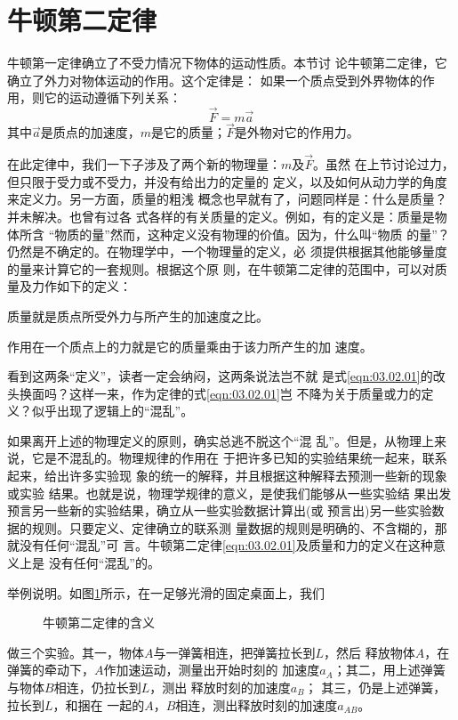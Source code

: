 \documentclass[../outline-of-mechanics.tex]{subfiles}
\begin{document}
\section{牛顿第二定律}\label{sec:03.02}

牛顿第一定律确立了不受力情况下物体的运动性质。本节讨
论牛顿第二定律，它确立了外力对物体运动的作用。这个定律是：
如果一个质点受到外界物体的作用，则它的运动遵循下列关系：
\begin{equation}\label{eqn:03.02.01}
  \vec{F} = m \vec{a}
\end{equation}
其中$\vec{a}$是质点的加速度，$m$是它的质量；$\vec{F}$是外物对它的作用力。

在此定律中，我们一下子涉及了两个新的物理量：$m$及$\vec{F}$。虽然
在上节讨论过力，但只限于受力或不受力，并没有给出力的定量的
定义，以及如何从动力学的角度来定义力。另一方面，质量的粗浅
概念也早就有了，问题同样是：什么是质量？并未解决。也曾有过各
式各样的有关质量的定义。例如，有的定义是：质量是物体所含
“物质的量”然而，这种定义没有物理的价值。因为，什么叫“物质
的量”？仍然是不确定的。在物理学中，一个物理量的定义，必
须提供根据其他能够量度的量来计算它的一套规则。根据这个原
则，在牛顿第二定律的范围中，可以对质量及力作如下的定义：

质量就是质点所受外力与所产生的加速度之比。

作用在一个质点上的力就是它的质量乘由于该力所产生的加
速度。

看到这两条“定义”，读者一定会纳闷，这两条说法岂不就
是式\eqref{eqn:03.02.01}的改头换面吗？这样一来，作为定律的式\eqref{eqn:03.02.01}岂
不降为关于质量或力的定义？似乎出现了逻辑上的“混乱”。

如果离开上述的物理定义的原则，确实总逃不脱这个“混
乱”。但是，从物理上来说，它是不混乱的。物理规律的作用在
于把许多已知的实验结果统一起来，联系起来，给出许多实验现
象的统一的解释，并且根据这种解释去预测一些新的现象或实验
结果。也就是说，物理学规律的意义，是使我们能够从一些实验结
果出发预言另一些新的实验结果，确立从一些实验数据计算出(或
预言出)另一些实验数据的规则。只要定义、定律确立的联系测
量数据的规则是明确的、不含糊的，那就没有任何“混乱”可
言。牛顿第二定律\lbr \eqref{eqn:03.02.01}\rbr 及质量和力的定义在这种意义上是
没有任何“混乱”的。

举例说明。如图\ref{fig:03.02}所示，在一足够光滑的固定桌面上，我们

\begin{figure}[!h]
  \centering
  \hfill
  \hfill
  \hfill
  \hfill
  \caption{牛顿第二定律的含义}
  \label{fig:03.02}
\end{figure}
\clearpage
\noindent 做三个实验。其一，物体$ A $与一弹簧相连，把弹簧拉长到$ L $，然后
释放物体$ A $，在弹簧的牵动下，$ A $作加速运动，测量出开始时刻的
加速度$ a_A $；其二，用上述弹簧与物体$ B $相连，仍拉长到$ L $，测出
释放时刻的加速度$ a _ { B } $； 其三，仍是上述弹簧，拉长到$ L $，和捆在
一起的$ A $，$ B $相连，测出释放时刻的加速度$ a _ { A B } $。
\end{document}
